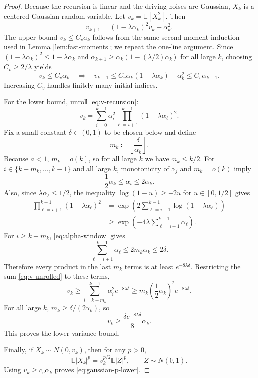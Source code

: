 \documentclass{article}
\newcommand{\E}{\mathbb{E}}
\begin{document}
\begin{proof}
Because the recursion is linear and the driving noises are Gaussian, $X_k$ is a centered Gaussian random variable. Let $v_k=\E[X_k^2]$. Then
\begin{equation}
  v_{k+1}=(1-\lambda\alpha_k)^2v_k+\alpha_k^2. \label{eq:v-recursion}
\end{equation}
The upper bound $v_k\le C_v\alpha_k$ follows from the same second-moment induction used in Lemma \ref{lem:fast-moments}; we repeat the one-line argument. Since $(1-\lambda\alpha_k)^2\le1-\lambda\alpha_k$ and $\alpha_{k+1}\ge\alpha_k(1-(\lambda/2)\alpha_k)$ for all large $k$, choosing $C_v\ge2/\lambda$ yields
\[
  v_k\le C_v\alpha_k
  \quad\Rightarrow\quad
  v_{k+1}\le C_v\alpha_k(1-\lambda\alpha_k)+\alpha_k^2
  \le C_v\alpha_{k+1}.
\]
Increasing $C_v$ handles finitely many initial indices.

For the lower bound, unroll \eqref{eq:v-recursion}:
\begin{equation}
  v_k=\sum_{i=0}^{k-1}\alpha_i^2\prod_{\ell=i+1}^{k-1}(1-\lambda\alpha_\ell)^2. \label{eq:v-unrolled}
\end{equation}
Fix a small constant $\delta\in(0,1)$ to be chosen below and define
\[
  m_k\coloneqq\left\lfloor \frac{\delta}{\alpha_k}\right\rfloor.
\]
Because $a<1$, $m_k=o(k)$, so for all large $k$ we have $m_k\le k/2$. For $i\in\{k-m_k,\ldots,k-1\}$ and all large $k$, monotonicity of $\alpha_j$ and $m_k=o(k)$ imply
\begin{equation}
  \frac12\alpha_k\le \alpha_i\le 2\alpha_k. \label{eq:alpha-window}
\end{equation}
Also, since $\lambda\alpha_\ell\le1/2$, the inequality $\log(1-u)\ge-2u$ for $u\in[0,1/2]$ gives
\[
\begin{aligned}
  \prod_{\ell=i+1}^{k-1}(1-\lambda\alpha_\ell)^2
  &=\exp\left(2\sum_{\ell=i+1}^{k-1}\log(1-\lambda\alpha_\ell)\right)\\
  &\ge \exp\left(-4\lambda\sum_{\ell=i+1}^{k-1}\alpha_\ell\right).
\end{aligned}
\]
For $i\ge k-m_k$, \eqref{eq:alpha-window} gives
\[
  \sum_{\ell=i+1}^{k-1}\alpha_\ell\le 2m_k\alpha_k\le 2\delta.
\]
Therefore every product in the last $m_k$ terms is at least $e^{-8\lambda\delta}$. Restricting the sum \eqref{eq:v-unrolled} to these terms,
\[
  v_k\ge \sum_{i=k-m_k}^{k-1}\alpha_i^2 e^{-8\lambda\delta}
  \ge m_k\left(\frac12\alpha_k\right)^2e^{-8\lambda\delta}.
\]
For all large $k$, $m_k\ge \delta/(2\alpha_k)$, so
\[
  v_k\ge \frac{\delta e^{-8\lambda\delta}}{8}\alpha_k.
\]
This proves the lower variance bound.

Finally, if $X_k\sim N(0,v_k)$, then for any $p>0$,
\[
  \E|X_k|^p = v_k^{p/2}\E|Z|^p,
  \qquad Z\sim N(0,1).
\]
Using $v_k\ge c_v\alpha_k$ proves \eqref{eq:gaussian-p-lower}.
\end{proof}
\end{document}
